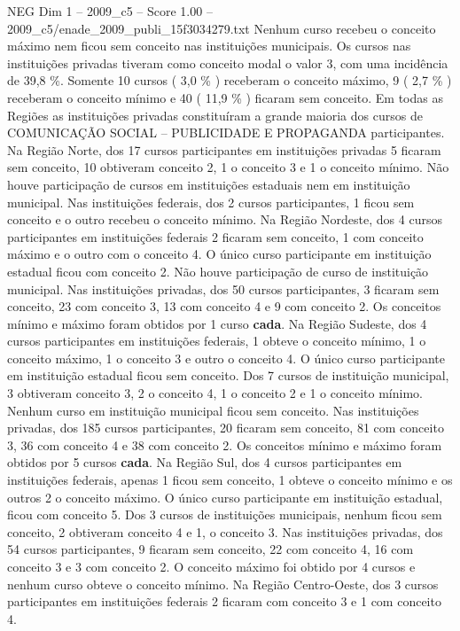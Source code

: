 \begin{textsample}{NEG Dim 1 – 2009\_c5 – Score 1.00 – 2009\_c5/enade\_2009\_publi\_15f3034279.txt}
Nenhum curso recebeu o conceito máximo nem ficou sem conceito nas instituições municipais.
Os cursos nas instituições privadas tiveram como conceito modal o valor 3, com uma incidência de 39,8 \%.
Somente 10 cursos ( 3,0 \% ) receberam o conceito máximo, 9 ( 2,7 \% ) receberam o conceito mínimo e 40 ( 11,9 \% ) ficaram sem conceito.
Em todas as Regiões as instituições privadas constituíram a grande maioria dos cursos de COMUNICAÇÃO SOCIAL – PUBLICIDADE E PROPAGANDA participantes.
Na Região Norte, dos 17 cursos participantes em instituições privadas 5 ficaram sem conceito, 10 obtiveram conceito 2, 1 o conceito 3 e 1 o conceito mínimo.
Não houve participação de cursos em instituições estaduais nem em instituição municipal.
Nas instituições federais, dos 2 cursos participantes, 1 ficou sem conceito e o outro recebeu o conceito mínimo.
Na Região Nordeste, dos 4 cursos participantes em instituições federais 2 ficaram sem conceito, 1 com conceito máximo e o outro com o conceito 4.
O único curso participante em instituição estadual ficou com conceito 2.
Não houve participação de curso de instituição municipal.
Nas instituições privadas, dos 50 cursos participantes, 3 ficaram sem conceito, 23 com conceito 3, 13 com conceito 4 e 9 com conceito 2.
Os conceitos mínimo e máximo foram obtidos por 1 curso \textbf{cada}.
Na Região Sudeste, dos 4 cursos participantes em instituições federais, 1 obteve o conceito mínimo, 1 o conceito máximo, 1 o conceito 3 e outro o conceito 4.
O único curso participante em instituição estadual ficou sem conceito.
Dos 7 cursos de instituição municipal, 3 obtiveram conceito 3, 2 o conceito 4, 1 o conceito 2 e 1 o conceito mínimo.
Nenhum curso em instituição municipal ficou sem conceito.
Nas instituições privadas, dos 185 cursos participantes, 20 ficaram sem conceito, 81 com conceito 3, 36 com conceito 4 e 38 com conceito 2.
Os conceitos mínimo e máximo foram obtidos por 5 cursos \textbf{cada}.
Na Região Sul, dos 4 cursos participantes em instituições federais, apenas 1 ficou sem conceito, 1 obteve o conceito mínimo e os outros 2 o conceito máximo.
O único curso participante em instituição estadual, ficou com conceito 5.
Dos 3 cursos de instituições municipais, nenhum ficou sem conceito, 2 obtiveram conceito 4 e 1, o conceito 3.
Nas instituições privadas, dos 54 cursos participantes, 9 ficaram sem conceito, 22 com conceito 4, 16 com conceito 3 e 3 com conceito 2.
O conceito máximo foi obtido por 4 cursos e nenhum curso obteve o conceito mínimo.
Na Região Centro-Oeste, dos 3 cursos participantes em instituições federais 2 ficaram com conceito 3 e 1 com conceito 4.

\end{textsample}
